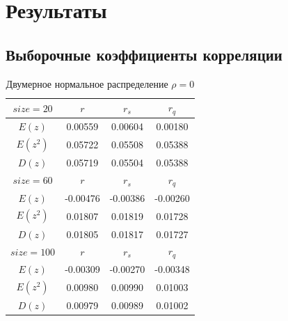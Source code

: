 \section{Результаты}

\subsection{Выборочные коэффициенты корреляции}

\begin{table}[H]
	\begin{center}
		\begin{tabular}{|c||c|c|c|}
			\hline
			$size = 20$ & $r$ & $r_s$ & $r_q$ \\ 
			\hline 
			$E(z)$ & 0.00559 & 0.00604 & 0.00180 \\ 
			\hline 
			$E(z^2)$ & 0.05722 & 0.05508 & 0.05388 \\ 
			\hline 
			$D(z)$ & 0.05719 & 0.05504 & 0.05388 \\ 
			\hline \hline 
			$size = 60$ & $r$ & $r_s$ & $r_q$ \\ 
			\hline 
			$E(z)$ & -0.00476 & -0.00386 & -0.00260 \\ 
			\hline 
			$E(z^2)$ & 0.01807 & 0.01819 & 0.01728 \\ 
			\hline 
			$D(z)$ & 0.01805 & 0.01817 & 0.01727 \\ 
			\hline \hline 
			$size = 100$ & $r$ & $r_s$ & $r_q$ \\ 
			\hline 
			$E(z)$ & -0.00309 & -0.00270 & -0.00348 \\ 
			\hline 
			$E(z^2)$ & 0.00980 & 0.00990 & 0.01003 \\ 
			\hline 
			$D(z)$ & 0.00979 & 0.00989 & 0.01002 \\ 
			\hline
		\end{tabular}
	\end{center}
	\caption{Двумерное нормальное распределение $\rho = 0$}
\end{table} 

